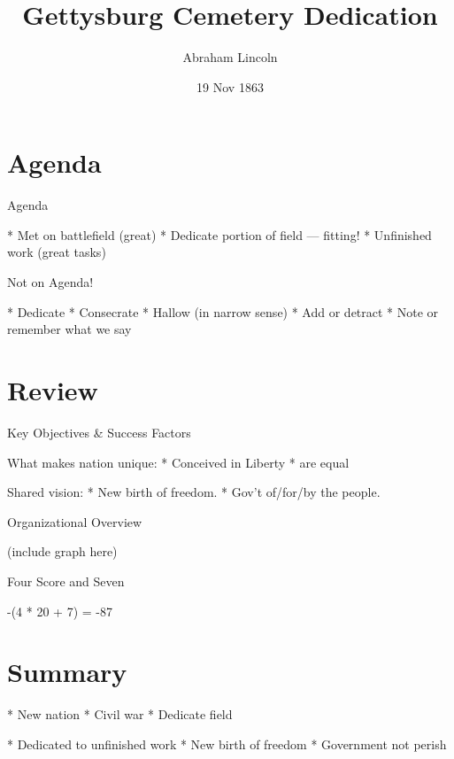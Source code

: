 \documentclass{beamer}
\begin{document}
\title{Gettysburg Cemetery Dedication}

\author{Abraham Lincoln}


\date{19 Nov 1863}
\begin{frame}
  \titlepage
\end{frame}
\section{Agenda}

Agenda

  * Met on battlefield (great)
  * Dedicate portion of field --- fitting!
  * Unfinished work (great tasks)

Not on Agenda!

  * Dedicate
  * Consecrate
  * Hallow (in narrow sense)
  * Add or detract
  * Note or remember what we say

\section{Review}

Key Objectives \& Success Factors

What makes nation unique:
  * Conceived in Liberty
  * are equal

Shared vision:
  * New birth of freedom.
  * Gov't of/for/by the people.

Organizational Overview

(include graph here)

Four Score and Seven

-(4 * 20 + 7) = -87

\section{Summary}

* New nation
* Civil war
* Dedicate field

* Dedicated to unfinished work
* New birth of freedom
* Government not perish
\end{document}
